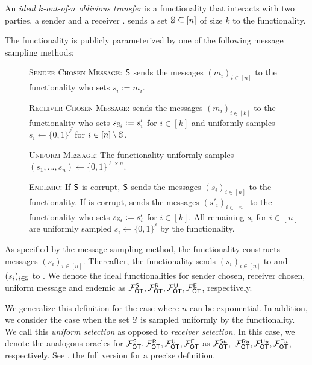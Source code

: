 \begin{definition}\label{def:ot}
An \emph{ideal $k$-out-of-$n$ oblivious transfer} is a functionality that interacts with two parties, a sender \send and a receiver \rec. \rec sends a set $\mathsf{\mathbb S}\subseteq[n]$ of size $k$ to the functionality.

The functionality is publicly parameterized by one of the following message sampling methods:
\begin{description}
\item[] \textsc{Sender Chosen Message:} $\mathsf{S}$ sends the messages $(m_i)_{i\in[n]}$ to the functionality who sets $s_i:=m_i$.

\item[] \textsc{Receiver Chosen Message:} \rec sends the messages $(m_i)_{i\in[k]}$ to the functionality who sets $s_{\mathsf{\mathbb S}_i}:=s'_i$ for $i\in[k]$ and uniformly samples $s_i\gets\{0,1\}^\ell$ for $i\in[n]\setminus\mathsf{\mathbb S}$.

\item[] \textsc{Uniform Message:} The functionality uniformly samples $(s_1,...,s_n)\gets\{0,1\}^{\ell\times n}$. 
 
\item[] \textsc{Endemic:} If $\mathsf{S}$ is corrupt, $\mathsf{S}$ sends the messages $(s_i)_{i\in[n]}$ to the functionality. If \rec is corrupt, \rec sends the messages $(s'_i)_{i\in[n]}$ to the functionality who sets $s_{\mathsf{\mathbb S}_i}:=s'_i$ for $i\in[k]$.
All remaining $s_i$ for $i\in [n]$ are uniformly sampled $s_i\gets\{0,1\}^\ell$ by  the functionality.
\end{description}

As specified by the message sampling method, the functionality constructs messages $(s_i)_{i\in[n]}$. Thereafter, the functionality sends $(s_i)_{i\in[n]}$ to \send and $(s_i)_{i\in \mathsf{\mathbb S}}$ to \rec. We denote the ideal functionalities for sender chosen, receiver chosen, uniform message and endemic as $\mathcal{F}_{\mathsf{OT}}^\mathsf{S}, \mathcal{F}_{\mathsf{OT}}^\mathsf{R},\mathcal{F}_{\mathsf{OT}}^\mathsf{U},\mathcal{F}_{\mathsf{OT}}^\mathsf{E}$, respectively. %
\end{definition}
\begin{remark}
We generalize this definition for the case where $n$ can be exponential. In addition, we consider the case when the set $\mathsf{\mathbb S}$ is sampled uniformly by the functionality. We call this \emph{uniform selection} as opposed to \emph{receiver selection}. In this case, we denote the analogous oracles for $\mathcal{F}_{\mathsf{OT}}^\mathsf{S}, \mathcal{F}_{\mathsf{OT}}^\mathsf{R},\mathcal{F}_{\mathsf{OT}}^\mathsf{U},\mathcal{F}_{\mathsf{OT}}^\mathsf{E}$ as $\mathcal{F}_{\mathsf{OT}}^{\mathsf{S} u},$ $\mathcal{F}_{\mathsf{OT}}^{\mathsf{R} u}, \mathcal{F}_{\mathsf{OT}}^{\mathsf{U} u}, \mathcal{F}_{\mathsf{OT}}^{\mathsf{E} u}$, respectively. See \iffullversion {}.
\else
the full version for a precise definition.
\fi
\end{remark}



